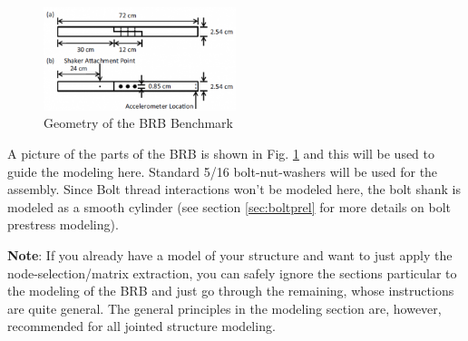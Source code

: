 \documentclass[11pt]{article}
\begin{document}
\begin{figure}[htbp]
\centering
\includegraphics[width=0.5\textwidth]{./figs/300px-BRB.png}
\caption{\label{fig:brbgeom}Geometry of the BRB Benchmark}
\end{figure}

A picture of the parts of the BRB is shown in Fig. \ref{fig:brbgeom} and this will be used to guide the modeling here.
Standard 5/16 bolt-nut-washers will be used for the assembly. Since Bolt thread interactions won't be modeled here, the bolt shank is modeled as a smooth cylinder (see section \ref{sec:boltprel} for more details on bolt prestress modeling).

\textbf{Note}: If you already have a model of your structure and want to just apply the node-selection/matrix extraction, you can safely ignore the sections particular to the modeling of the BRB and just go through the remaining, whose instructions are quite general.
The general principles in the modeling section are, however, recommended for all jointed structure modeling.
\end{document}
